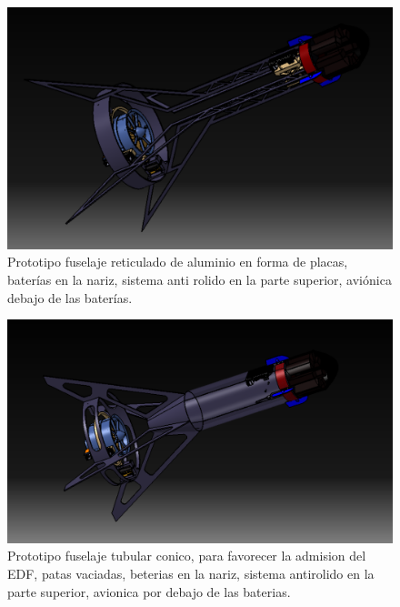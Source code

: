 \begin{figure}[htb]
    \centering
    \includegraphics[width=\linewidth]{fig/design/2}
    \caption{Prototipo fuselaje reticulado de aluminio en forma de placas, baterías en la nariz, sistema anti
    rolido en la parte superior, aviónica debajo de las baterías.}
    \label{fig:design/2}
\end{figure}

\begin{figure}[htb]
    \centering
    \includegraphics[width=\linewidth]{fig/design/3}
    \caption{Prototipo fuselaje tubular conico, para favorecer la admision del EDF, patas vaciadas, beterias en la nariz, sistema antirolido en la parte superior,  avionica por debajo de las baterias.}
    \label{fig:design/3}
\end{figure}

